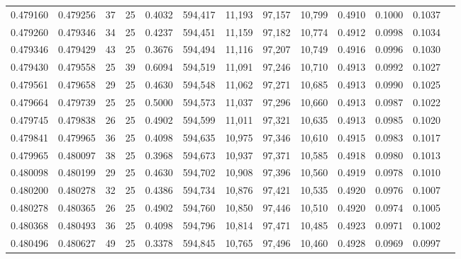 \begin{tabular}{rrrrrrrrrrrrr}
0.479160 & 0.479256 &    37 &  25 &                                     0.4032 & 594,417 &  11,193 &  97,157 &  10,799 & 0.4910 & 0.1000 & 0.1037 \\
0.479260 & 0.479346 &    34 &  25 &                                     0.4237 & 594,451 &  11,159 &  97,182 &  10,774 & 0.4912 & 0.0998 & 0.1034 \\
0.479346 & 0.479429 &    43 &  25 &                                     0.3676 & 594,494 &  11,116 &  97,207 &  10,749 & 0.4916 & 0.0996 & 0.1030 \\
0.479430 & 0.479558 &    25 &  39 &                                     0.6094 & 594,519 &  11,091 &  97,246 &  10,710 & 0.4913 & 0.0992 & 0.1027 \\
0.479561 & 0.479658 &    29 &  25 &                                     0.4630 & 594,548 &  11,062 &  97,271 &  10,685 & 0.4913 & 0.0990 & 0.1025 \\
0.479664 & 0.479739 &    25 &  25 &                                     0.5000 & 594,573 &  11,037 &  97,296 &  10,660 & 0.4913 & 0.0987 & 0.1022 \\
0.479745 & 0.479838 &    26 &  25 &                                     0.4902 & 594,599 &  11,011 &  97,321 &  10,635 & 0.4913 & 0.0985 & 0.1020 \\
0.479841 & 0.479965 &    36 &  25 &                                     0.4098 & 594,635 &  10,975 &  97,346 &  10,610 & 0.4915 & 0.0983 & 0.1017 \\
0.479965 & 0.480097 &    38 &  25 &                                     0.3968 & 594,673 &  10,937 &  97,371 &  10,585 & 0.4918 & 0.0980 & 0.1013 \\
0.480098 & 0.480199 &    29 &  25 &                                     0.4630 & 594,702 &  10,908 &  97,396 &  10,560 & 0.4919 & 0.0978 & 0.1010 \\
0.480200 & 0.480278 &    32 &  25 &                                     0.4386 & 594,734 &  10,876 &  97,421 &  10,535 & 0.4920 & 0.0976 & 0.1007 \\
0.480278 & 0.480365 &    26 &  25 &                                     0.4902 & 594,760 &  10,850 &  97,446 &  10,510 & 0.4920 & 0.0974 & 0.1005 \\
0.480368 & 0.480493 &    36 &  25 &                                     0.4098 & 594,796 &  10,814 &  97,471 &  10,485 & 0.4923 & 0.0971 & 0.1002 \\
0.480496 & 0.480627 &    49 &  25 &                                     0.3378 & 594,845 &  10,765 &  97,496 &  10,460 & 0.4928 & 0.0969 & 0.0997 \\

\end{tabular}
